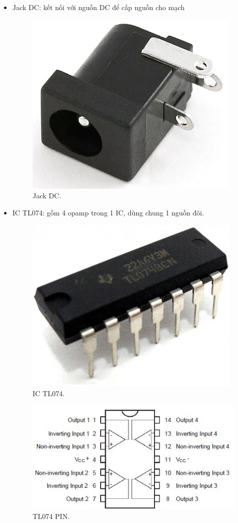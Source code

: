 \documentclass[a4paper,12pt,oneside]{article}
\begin{document}
\begin{enumerate}
\begin{itemize}
\item	Jack DC: kết nối với nguồn DC để cấp nguồn cho mạch
\begin{figure}[H]
\centering
\includegraphics[scale=.5]{hinh/PPM/ppm_jackdc.jpg}
\caption{Jack DC\cite{dientuachau}.}
\end{figure}

\item	IC TL074: gồm 4 opamp trong 1 IC, dùng chung 1 nguồn đôi.
\begin{figure}[H]
\centering
\includegraphics[scale=.5]{hinh/PPM/ppm_tl074.jpg}
\caption{IC TL074\cite{dientuachau}.}
\end{figure}

\begin{figure}[H]
\centering
\includegraphics[scale=1]{hinh/PPM/ppm_tl074_pin.jpg}
\caption{TL074 PIN\cite{tl074}.}
\end{figure}


\end{itemize}
\end{enumerate}
\end{document}
